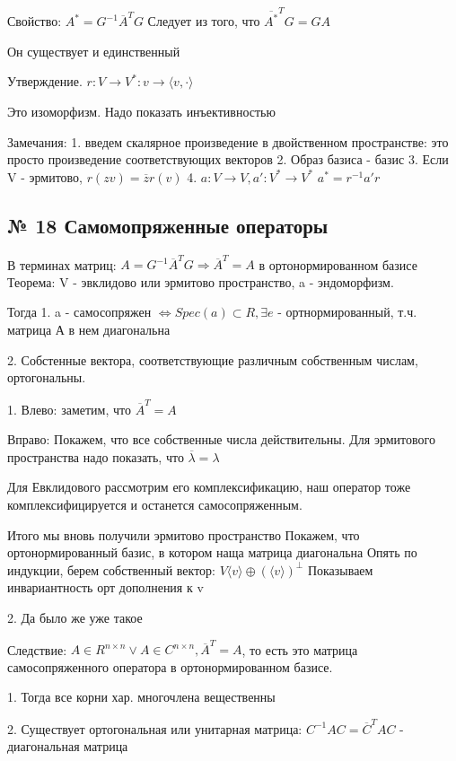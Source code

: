 \documentclass{article}
\begin{document}
Свойство: $A^* = G^{-1}\overline{A}^T G$ Следует из того, что $\overline{A^*}^TG = GA$

Он существует и единственный

Утверждение.
$r: V \rightarrow V^* : v \rightarrow \langle v, \cdot \rangle$

Это изоморфизм. Надо показать инъективностью

Замечания:
1. введем скалярное произведение в двойственном пространстве: это просто произведение соответствующих векторов
2. Образ базиса - базис
3. Если V - эрмитово, $r(zv) = \overline{z}r(v)$
4. $a : V \rightarrow V, a' : V^* \rightarrow V^*$
$a^* = r^{-1}a'r$

\subsection{\tiny № 18 Самомопряженные операторы}

В терминах матриц: $A = G^{-1}\overline{A}^TG \Rightarrow \overline{A}^T = A$ в ортонормированном базисе
Теорема:
V - эвклидово или эрмитово пространство, a - эндоморфизм.

Тогда
1. a - самосопряжен $\Leftrightarrow Spec(a) \subset R, \exists e$ - ортнормированный, т.ч. матрица А в нем диагональна 

2. Собстенные вектора, соответствующие различным собственным числам, ортогональны.

1. Влево: заметим, что $\overline{A}^T = A$

Вправо: Покажем, что все собственные числа действительны. Для эрмитового пространства надо показать, что $\overline{\lambda} = \lambda$

Для Евклидового рассмотрим его комплексификацию, наш оператор тоже комплексифицируется и останется самосопряженным.

Итого мы вновь получили эрмитово пространство
Покажем, что ортонормированный базис, в котором наща матрица диагональна
Опять по индукции, берем собственный вектор: $V \langle v \rangle \oplus (\langle v \rangle)^\perp$
Показываем инвариантность орт дополнения к v

2. Да было же уже такое

Следствие:
$A \in R^{n \times n} \vee A \in C^{n \times n}, \overline{A}^T = A$, то есть это матрица самосопряженного оператора в ортонормированном базисе.

1. Тогда все корни хар. многочлена вещественны

2. Существует ортогональная или унитарная матрица: $C^{-1}AC = \overline{C}^TAC$ - диагональная матрица
\end{document}
